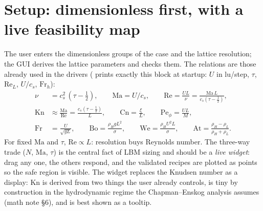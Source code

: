 \documentclass[11pt,a4paper]{article}
\newcommand{\Ma}{\mathrm{Ma}}
\renewcommand{\Re}{\mathrm{Re}}
\newcommand{\Fr}{\mathrm{Fr}}
\newcommand{\Bo}{\mathrm{Bo}}
\newcommand{\We}{\mathrm{We}}
\newcommand{\Pe}{\mathrm{Pe}}
\newcommand{\Cn}{\mathrm{Cn}}
\newcommand{\Kn}{\mathrm{Kn}}
\newcommand{\At}{\mathrm{At}}
\newcommand{\cs}{c_s}
\begin{document}
\section{Setup: dimensionless first, with a live feasibility map}\label{sec:units}
The user enters the dimensionless groups of the case and the lattice resolution;
the GUI derives the lattice parameters and checks them. The relations are those
already used in the drivers ( prints exactly this block at
startup: $U$ in lu/step, $\tau$, $\Re_L$, $U/\cs$, $\Fr_h$):
\begin{align}
\nu &= \cs^2\,(\tau-\tfrac12), \qquad \Ma = U/\cs, \qquad \Re = \frac{UL}{\nu}
      = \frac{\Ma\,L}{\cs(\tau-\tfrac12)}, \\
\Kn &\approx \frac{\Ma}{\Re} = \frac{\cs(\tau-\tfrac12)}{L}, \qquad
\Cn = \frac{\xi}{L}, \qquad \Pe_\phi = \frac{UL}{M}, \\
\Fr &= \frac{U}{\sqrt{gL}}, \qquad \Bo = \frac{\rho_H g L^2}{\sigma}, \qquad
\We = \frac{\rho_H U^2 L}{\sigma}, \qquad \At = \frac{\rho_H-\rho_L}{\rho_H+\rho_L}.
\end{align}
For fixed $\Ma$ and $\tau$, $\Re\propto L$: resolution buys Reynolds number. The
three-way trade ($N$, $\Ma$, $\tau$) is the central fact of LBM sizing and should be
a \emph{live widget}: drag any one, the others respond, and the validated recipes
are plotted as points so the safe region is visible. The widget replaces the
Knudsen number as a display: $\Kn$ is derived from two things the user already
controls, is tiny by construction in the hydrodynamic regime the Chapman--Enskog
analysis assumes (math note \S6), and is best shown as a tooltip.
\end{document}
